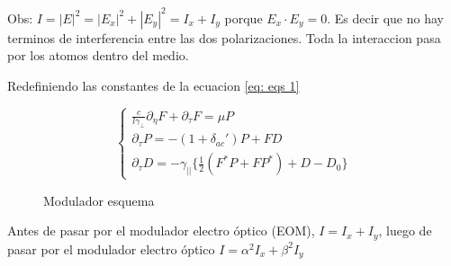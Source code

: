 				Obs: $I=|E|^2=|E_x|^2+|E_y|^2=I_x+I_y$ porque $E_x\cdot E_y=0$. Es decir que no hay terminos de interferencia entre las dos polarizaciones. Toda la interaccion pasa por los atomos dentro del medio.
				
				Redefiniendo las constantes de la ecuacion \ref{eq: eqs 1}
				
				\begin{equation}
				\begin{cases}
				\frac{c}{l\gamma_{\bot}}\partial_{\eta}F+\partial_{\tau}F= \mu P\\
				\partial_{\tau} P=-{(1+\delta_{ac}')P+FD}\\
				\partial_{\tau}D=-\gamma_{||}\{\frac{1}{2}(F^*P+FP^*)+D-D_0\}
				\end{cases}
				\label{eq: eqs 2}
				\end{equation}  %
				
				\begin{figure}[htc]
					\begin{center}
						
						\caption{Modulador esquema}
						\label{fig: EOM}
					\end{center}
					
				\end{figure}
				
				
				Antes de pasar por el modulador electro óptico (EOM), $I=I_x+I_y$, luego de pasar por el modulador electro óptico $I=\alpha^2 I_x+\beta^2 I_y$
				
